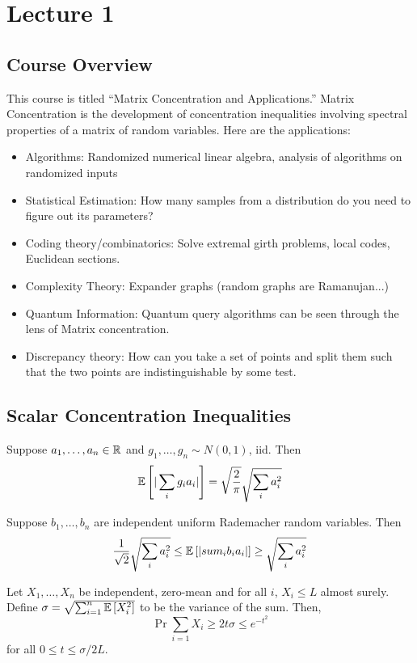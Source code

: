 \newcommand{\Cut}{\textrm{Cut}}
\section{Lecture 1}
\subsection{Course Overview}
This course is titled ``Matrix Concentration and Applications.'' Matrix Concentration
is the development of concentration inequalities involving spectral properties of a matrix of random variables.
Here are the applications:
\begin{itemize}
    \item Algorithms: Randomized numerical linear algebra, analysis of algorithms on randomized inputs
    \item Statistical Estimation: How many samples from a distribution do you need to figure out its parameters?
    \item Coding theory/combinatorics: Solve extremal girth problems, local codes, Euclidean sections.
    \item Complexity Theory: Expander graphs (random graphs are Ramanujan...)
    \item Quantum Information: Quantum query algorithms can be seen through the lens of Matrix concentration.
    \item Discrepancy theory: How can you take a set of points and split them such that the
    two points are indistinguishable by some test.
\end{itemize}

\subsection{Scalar Concentration Inequalities}
\begin{theorem}[Khintchine]
Suppose $a_1, \dots, a_n \in \operatorname{\mathbb{R}}$ and $g_1, \dots, g_n \sim N(0, 1)$, iid.
Then
\[\mathbb{E}\left[ |\sum_i g_i a_i| \right] = \sqrt{\frac{2}{\pi}} \sqrt{\sum_i a_i^2} \]

Suppose $b_1, \dots, b_n$ are independent uniform Rademacher random variables. Then
\[ \frac{1}{\sqrt{2}} \sqrt{\sum_i a_i^2} \le \mathbb{E}\left[ |sum_i b_i a_i| \right] \ge \sqrt{\sum_i a_i^2} \]
\end{theorem}

\begin{theorem}[Bernstein]
    Let $X_1, \dots, X_n$ be independent, zero-mean and for all $i$, $X_i \le L$ almost surely.
    Define $\sigma = \sqrt{\sum_{i = 1}^n \mathbb{E}\left[ X_i^2 \right]}$ to be the variance of the sum.
    Then,
    \[ \Pr{\sum_{i = 1} X_i \ge 2t\sigma} \le e^{-t^2} \]
    for all $0 \le t \le \sigma/2L$.
\end{theorem}

